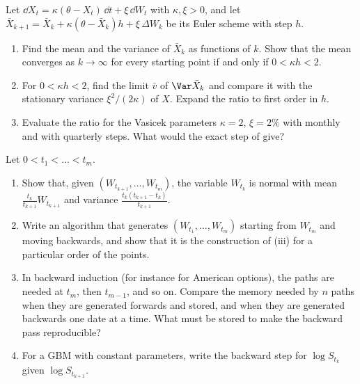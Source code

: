 \begin{exercise}\label{ex:ps-ou-euler}
\easy Let $\dd X_t=\kappa(\theta-X_t)\,\dd t+\xi\,\dd W_t$ with $\kappa,\xi>0$, and let
$\bar X_{k+1}=\bar X_k+\kappa(\theta-\bar X_k)h+\xi\,\Delta W_k$ be its Euler scheme with step
$h$.
\begin{enumerate}[label=(\alph*)]
  \item Find the mean and the variance of $\bar X_k$ as functions of $k$. Show that the mean
    converges as $k\to\infty$ for every starting point if and only if $0<\kappa h<2$.
  \item For $0<\kappa h<2$, find the limit $\bar v$ of $\Var\bar X_k$ and compare it with the
    stationary variance $\xi^2/(2\kappa)$ of $X$. Expand the ratio to first order in $h$.
  \item Evaluate the ratio for the Vasicek parameters $\kappa=2$, $\xi=2\%$ with monthly and
    with quarterly steps. What would the exact step of  give?
\end{enumerate}
\end{exercise}

\begin{exercise}\label{ex:ps-backward}
\medium Let $0<t_1<\dots<t_m$.
\begin{enumerate}[label=(\alph*)]
  \item Show that, given $(W_{t_{k+1}},\dots,W_{t_m})$, the variable $W_{t_k}$ is normal with
    mean $\frac{t_k}{t_{k+1}}W_{t_{k+1}}$ and variance $\frac{t_k(t_{k+1}-t_k)}{t_{k+1}}$.
  \item Write an algorithm that generates $(W_{t_1},\dots,W_{t_m})$ starting from
    $W_{t_m}$ and moving backwards, and show that it is the construction of
    (iii) for a particular order of the points.
  \item In backward induction (for instance for American options), the paths are needed at
    $t_m$, then $t_{m-1}$, and so on. Compare the memory needed by $n$ paths when they are
    generated forwards and stored, and when they are generated backwards one date at a time.
    What must be stored to make the backward pass reproducible?
  \item For a GBM with constant parameters, write the backward step for $\log S_{t_k}$ given
    $\log S_{t_{k+1}}$.
\end{enumerate}
\end{exercise}

